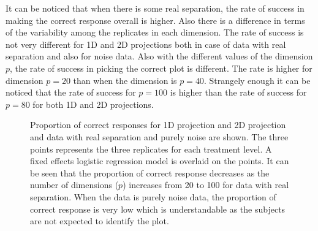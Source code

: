 It can be noticed that when there is some real separation, the rate of success in making the correct response overall is higher. Also there is a difference in terms of the variability among the replicates in each dimension.
 The rate of success is not very different for 1D and 2D projections both in case of data with real separation and also for noise data. %
Also with the different values of the dimension $p$, the rate of success in picking the correct plot is different. The rate is higher for dimension $p = 20$ than when the dimension is $p = 40$. Strangely enough it can be noticed that the rate of success for $p = 100$ is higher than the rate of success for $p=80$ for both 1D and 2D projections. 

\begin{figure}[ht]
   \centering
      \caption{Proportion of correct responses for 1D projection and 2D projection and data with real separation and purely noise are shown. The three points represents the three replicates for each treatment level. A fixed effects logistic regression model is overlaid on the points. It can be seen that the proportion of correct response decreases as the number of dimensions ($p$) increases from 20 to 100 for data with real separation. When the data is purely noise data, the proportion of correct response is very low which is understandable as the subjects are not expected to identify the plot.  }
       \label{suc-rate-glm}
\end{figure}

